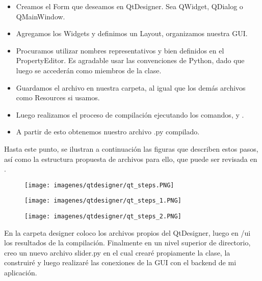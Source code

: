 \begin{itemize}
    \item Creamos el Form que deseamos en QtDesigner. Sea QWidget, QDialog o QMainWindow.
    \item Agregamos los Widgets y definimos un Layout, organizamos nuestra GUI.
    \item Procuramos utilizar nombres representativos y bien definidos en el PropertyEditor. Es agradable usar las convenciones de Python, dado que luego se acceder\'an como miembros de la clase.
    \item Guardamos el archivo en nuestra carpeta, al igual que los dem\'as archivos como Resources si usamos.
    \item Luego realizamos el proceso de compilaci\'on ejecutando los comandos,  y .
    \item A partir de esto obtenemos nuestro archivo .py compilado.
\end{itemize}

Hasta este punto, se ilustran a continuaci\'on las figuras que describen estos pasos, as\'i como la estructura propuesta de archivos para ello,
que puede ser revisada en .

\begin{figure}[H]
    \centering
    \texttt{[image: imagenes/qtdesigner/qt\_steps.PNG]}
\end{figure}

\begin{figure}[H]
    \centering
    \texttt{[image: imagenes/qtdesigner/qt\_steps\_1.PNG]}
\end{figure}

\begin{figure}[H]
    \centering
    \texttt{[image: imagenes/qtdesigner/qt\_steps\_2.PNG]}
\end{figure}

En la carpeta designer coloco los archivos propios del QtDesigner, luego en /ui los resultados de la compilaci\'on. Finalmente en un nivel superior de directorio,
creo un nuevo archivo slider.py en el cual crear\'e propiamente la clase, la construir\'e y luego realizar\'e las conexiones de la GUI con el backend de mi aplicaci\'on.

